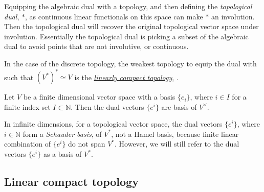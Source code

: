     
    
        
        Equipping the algebraic dual with a topology, and then defining the \emph{topological dual}, \( *\), as continuous linear functionals on this space can make \(*\) an involution. Then the topological dual will recover the original topological vector space under involution. Essentially the topological dual is picking a subset of the algebraic dual to avoid points that are not involutive, or continuous.
        
        In the case of the discrete topology, the weakest topology to equip the dual with such that \( (V^*)^* \simeq V\) is the \hyperref[defn:lctop]{\emph{linearly compact topology}}, \cite{lefschetz1942algebraic, top_ent_local_lin_comp, finiteness_spaces_presheaves}.
        
        \begin{rem}
        Let \(V\) be a finite dimensional vector space with a basis \(\{ e_i\}\), where \( i \in I\) for a finite index set \( I \subset \mathbb{N}\). Then the dual vectors \( \{e^i\}\) are basis of \(V^{\vee}\).
        
        In infinite dimensions, for a topological vector space, the dual vectors \(\{e^i \}\), where \(i \in \mathbb{N}\) form a \emph{Schauder basis}, \cite{basis_vect} of \(V^*\), not a Hamel basis, because finite linear combination of \( \{e^i\}\) do not span \(V^*\). However, we will still refer to the dual vectors \(\{e^i\}\) as a basis of \(V^*\). 
        \end{rem}

        
        
        \subsection{Linear compact topology}
        

